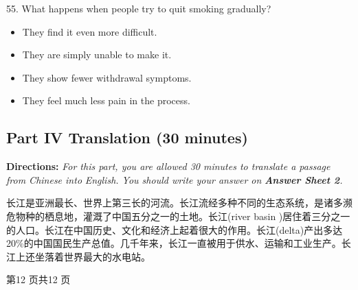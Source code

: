 \documentclass[UTF8,11pt]{ctexart}
\begin{document}
55. What happens when people try to quit smoking gradually?


\begin{itemize}[leftmargin=2em,itemsep=.2em,topsep=.4em]\item[A.] They find it even more difficult.
\item[B.] They are simply unable to make it.
\item[C.] They show fewer withdrawal symptoms.
\item[D.] They feel much less pain in the process.
\end{itemize}

\subsection*{\textbf{Part IV} \textbf{Translation} \textbf{(30 minutes)}}


\textbf{Directions:}\textit{ For this part, you are allowed 30 minutes to translate a passage from Chinese into} \textit{English. You should write your answer on}\textbf{\textit{ Answer Sheet 2}}\textit{.}


长江是亚洲最长、世界上第三长的河流。长江流经多种不同的生态系统，是诸多濒危物种的栖息地，灌溉了中国五分之一的土地。长江(river basin )居住着三分之一的人口。长江在中国历史、文化和经济上起着很大的作用。长江(delta)产出多达20\%的中国国民生产总值。几千年来，长江一直被用于供水、运输和工业生产。长江上还坐落着世界最大的水电站。


第12 页共12 页
\end{document}
